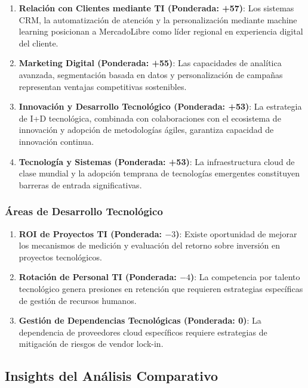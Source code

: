 \begin{enumerate}
\item \textbf{Relación con Clientes mediante TI (Ponderada: +57)}: Los sistemas CRM, la automatización de atención y la personalización mediante machine learning posicionan a MercadoLibre como líder regional en experiencia digital del cliente.

\item \textbf{Marketing Digital (Ponderada: +55)}: Las capacidades de analítica avanzada, segmentación basada en datos y personalización de campañas representan ventajas competitivas sostenibles.

\item \textbf{Innovación y Desarrollo Tecnológico (Ponderada: +53)}: La estrategia de I+D tecnológica, combinada con colaboraciones con el ecosistema de innovación y adopción de metodologías ágiles, garantiza capacidad de innovación continua.

\item \textbf{Tecnología y Sistemas (Ponderada: +53)}: La infraestructura cloud de clase mundial y la adopción temprana de tecnologías emergentes constituyen barreras de entrada significativas.
\end{enumerate}

\subsubsection{Áreas de Desarrollo Tecnológico}

\begin{enumerate}
\item \textbf{ROI de Proyectos TI (Ponderada: $-3$)}: Existe oportunidad de mejorar los mecanismos de medición y evaluación del retorno sobre inversión en proyectos tecnológicos.

\item \textbf{Rotación de Personal TI (Ponderada: $-4$)}: La competencia por talento tecnológico genera presiones en retención que requieren estrategias específicas de gestión de recursos humanos.

\item \textbf{Gestión de Dependencias Tecnológicas (Ponderada: 0)}: La dependencia de proveedores cloud específicos requiere estrategias de mitigación de riesgos de vendor lock-in.
\end{enumerate}

\subsection{Insights del Análisis Comparativo}

